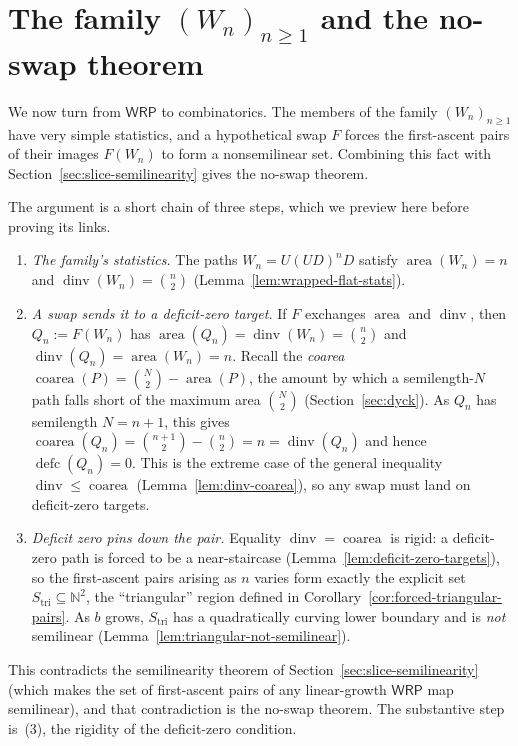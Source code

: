 \documentclass[11pt]{article}
\theoremstyle{definition}
\newcommand{\N}{\mathbb N}
\newcommand{\WRP}{\mathsf{WRP}}
\newcommand{\area}{\operatorname{area}}
\newcommand{\dinv}{\operatorname{dinv}}
\newcommand{\coarea}{\operatorname{coarea}}
\newcommand{\defc}{\operatorname{defc}}
\begin{document}
\section{The family \texorpdfstring{$(W_n)_{n\ge1}$}{(Wn), n >= 1}
and the no-swap theorem}\label{sec:wrapped-flat}\label{sec:main}

We now turn from $\WRP$ to combinatorics.  The members of the family
$(W_n)_{n\ge1}$ have very simple statistics, and a hypothetical swap $F$
forces the first-ascent pairs of their images $F(W_n)$ to form a nonsemilinear
set.  Combining this fact with
Section~\ref{sec:slice-semilinearity} gives the no-swap theorem.

The argument is a short chain of three steps, which we preview here before
proving its links.
\begin{enumerate}[label=(\arabic*)]
\item \emph{The family's statistics.}  The paths $W_n=U(UD)^nD$ satisfy
$\area(W_n)=n$ and $\dinv(W_n)=\binom n2$ (Lemma~\ref{lem:wrapped-flat-stats}).
\item \emph{A swap sends it to a deficit-zero target.}  If $F$ exchanges
$\area$ and $\dinv$, then $Q_n:=F(W_n)$ has
$\area(Q_n)=\dinv(W_n)=\binom n2$ and
$\dinv(Q_n)=\area(W_n)=n$.  Recall the \emph{coarea}
$\coarea(P)=\binom N2-\area(P)$, the amount by which a semilength-$N$ path falls
short of the maximum area $\binom N2$ (Section~\ref{sec:dyck}).  As $Q_n$ has
semilength $N=n+1$, this gives $\coarea(Q_n)=\binom{n+1}2-\binom n2=n=\dinv(Q_n)$
and hence $\defc(Q_n)=0$.  This is the extreme case of the general inequality
$\dinv\le\coarea$ (Lemma~\ref{lem:dinv-coarea}), so any swap must land on
deficit-zero targets.
\item \emph{Deficit zero pins down the pair.}  Equality $\dinv=\coarea$ is
rigid: a deficit-zero path is forced to be a near-staircase
(Lemma~\ref{lem:deficit-zero-targets}), so the first-ascent pairs arising as
$n$ varies form exactly the explicit set
$S_{\mathrm{tri}}\subseteq\N^2$, the ``triangular'' region defined in
Corollary~\ref{cor:forced-triangular-pairs}.  As $b$ grows,
$S_{\mathrm{tri}}$ has a quadratically curving lower boundary and is \emph{not}
semilinear (Lemma~\ref{lem:triangular-not-semilinear}).
\end{enumerate}
This contradicts the semilinearity theorem of
Section~\ref{sec:slice-semilinearity} (which makes the set of first-ascent pairs
of any linear-growth $\WRP$ map semilinear), and that contradiction is the
no-swap theorem.  The substantive step is~(3), the rigidity of the
deficit-zero condition.
\end{document}
